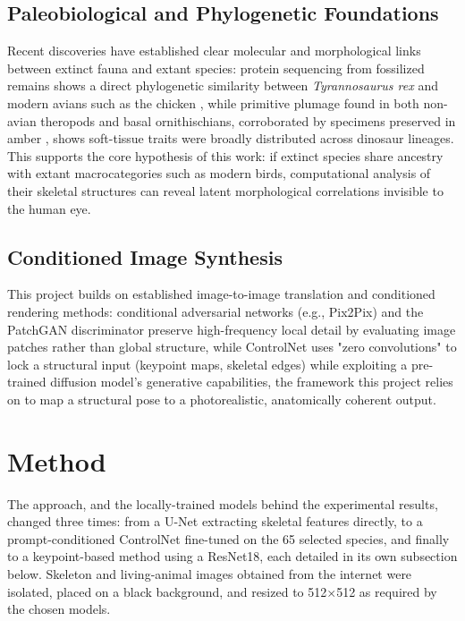\documentclass{article}
\begin{document}
\subsection{Paleobiological and Phylogenetic Foundations}
Recent discoveries have established clear molecular and morphological links between extinct fauna and extant species: protein sequencing from fossilized remains shows a direct phylogenetic similarity between \textit{Tyrannosaurus rex} and modern avians such as the chicken \cite{asara2007protein, organ2008molecular}, while primitive plumage found in both non-avian theropods and basal ornithischians, corroborated by specimens preserved in amber \cite{xing2016feathered, godefroit2014jurassic}, shows soft-tissue traits were broadly distributed across dinosaur lineages. This supports the core hypothesis of this work: if extinct species share ancestry with extant macrocategories such as modern birds, computational analysis of their skeletal structures can reveal latent morphological correlations invisible to the human eye.

\subsection{Conditioned Image Synthesis}
This project builds on established image-to-image translation and conditioned rendering methods: conditional adversarial networks (e.g., Pix2Pix) and the PatchGAN discriminator \cite{isola2017image} preserve high-frequency local detail by evaluating image patches rather than global structure, while ControlNet \cite{zhang2023adding} uses "zero convolutions" to lock a structural input (keypoint maps, skeletal edges) while exploiting a pre-trained diffusion model's generative capabilities, the framework this project relies on to map a structural pose to a photorealistic, anatomically coherent output.


\section{Method}
\label{sec:method}
The approach, and the locally-trained models behind the experimental results, changed three times: from a U-Net extracting skeletal features directly, to a prompt-conditioned ControlNet fine-tuned on the 65 selected species, and finally to a keypoint-based method using a ResNet18, each detailed in its own subsection below. Skeleton and living-animal images obtained from the internet were isolated, placed on a black background, and resized to 512$\times$512 as required by the chosen models.
\end{document}
